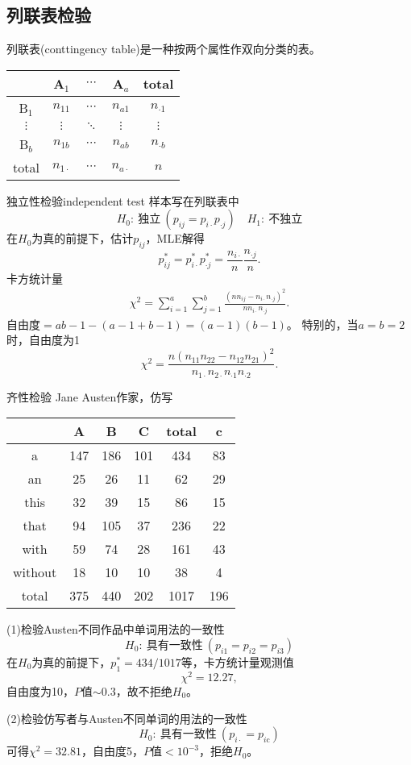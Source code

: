 \subsection{列联表检验}
列联表(conttingency table)是一种按两个属性作双向分类的表。
\begin{center}
	\begin{tabular}{c|ccc|c}
		\toprule
		&A$_1$&$\cdots$&A$_a$&total\\
		\hline
		B$_1$&$n_{11}$&$\cdots$&$n_{a1}$&$n_{\cdot 1}$\\
		$\vdots$&$\vdots$&$\ddots$&$\vdots$&$\vdots$\\
		B$_b$&$n_{1b}$&$\cdots$&$n_{ab}$&$n_{\cdot b}$\\
		\hline
		total&$n_{1\cdot}$&$\cdots$&$n_{a\cdot}$&$n$\\
		\bottomrule
	\end{tabular}
\end{center}
\begin{example}{独立性检验}{independent test}
	样本写在列联表中
	\[
		H_0:~\text{独立}~(p_{ij}=p_{i\cdot}p_{\cdot j})\quad H_1:~\text{不独立}
	\]
	在$H_0$为真的前提下，估计$p_{ij}$，MLE解得
	\[
		p_{ij}^\ast=p_{i\cdot}^\ast p_{\cdot j}^\ast=\frac{n_{i\cdot}}n\frac{n_{\cdot j}}n.
	\]
	卡方统计量
	\begin{align}
		\chi^2=\sum_{i=1}^a\sum_{j=1}^b\frac{(nn_{ij}-n_{i\cdot}n_{\cdot j})^2}{nn_{i\cdot}n_{\cdot j}}.
	\end{align}
	自由度$=ab-1-(a-1+b-1)=(a-1)(b-1)$。
	\tcblower
	特别的，当$a=b=2$时，自由度为1
	\[
		\chi^2=\frac{n(n_{11}n_{22}-n_{12}n_{21})^2}{n_{1\cdot}n_{2\cdot}n_{\cdot 1}n_{\cdot 2}}.
	\]
\end{example}
\begin{example}{齐性检验}{}
	Jane Austen作家，仿写
	\begin{center}
		\begin{tabular}{c|ccc|c|c}
			\toprule
			&A&B&C&total&c\\
			\hline
			a&147&186&101&434&83\\
			an&25&26&11&62&29\\
			this&32&39&15&86&15\\
			that&94&105&37&236&22\\
			with&59&74&28&161&43\\
			without&18&10&10&38&4\\
			\hline
			total&375&440&202&1017&196\\
			\bottomrule
		\end{tabular}
	\end{center}
	(1)检验Austen不同作品中单词用法的一致性
	\[
		H_0:~\text{具有一致性}~(p_{i1}=p_{i2}=p_{i3})
	\]
	在$H_0$为真的前提下，$p_1^\ast=434/1017$等，卡方统计量观测值
	\[
		\chi^2=12.27,
	\]
	自由度为10，$P$值$\sim 0.3$，故不拒绝$H_0$。

	(2)检验仿写者与Austen不同单词的用法的一致性
	\[
		H_0:~\text{具有一致性}~(p_{i\cdot}=p_{i\mathrm c})
	\]
	可得$\chi^2=32.81$，自由度5，$P$值$<10^{-3}$，拒绝$H_0$。
\end{example}
